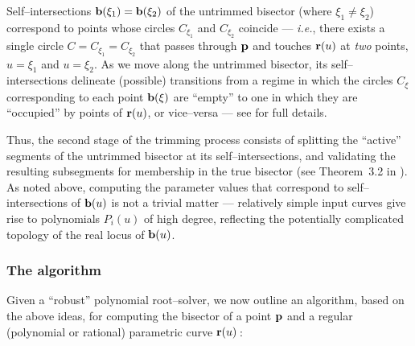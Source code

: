 Self--intersections ${\bf b}(\xi_1)={\bf b}(\xi_2)$ of the
untrimmed bisector (where $\xi_1\not=\xi_2$) correspond to points
whose circles $C_{\xi_1}$ and $C_{\xi_2}$ coincide --- {\it i.e.},
there exists a single circle $C=C_{\xi_1}=C_{\xi_2}$ that passes
through ${\bf p}$ and touches ${\bf r}(u)$ at {\it two\/} points,
$u=\xi_1$ and $u=\xi_2$. As we move along the untrimmed bisector,
its self--intersections delineate (possible) transitions from a
regime in which the circles $C_\xi$ corresponding to each point
${\bf b}(\xi)$ are ``empty'' to one in which they are ``occupied''
by points of ${\bf r}(u)$, or vice--versa --- see \cite{farouki91b}
for full details.

Thus, the second stage of the trimming process consists of
splitting the ``active'' segments of the untrimmed bisector at
its self--intersections, and validating the resulting subsegments
for membership in the true bisector (see Theorem~3.2 in \cite
{farouki91b}). As noted above, computing the parameter values
that correspond to self--intersections of ${\bf b}(u)$ is not
a trivial matter --- relatively simple input curves give rise to
polynomials $P_i(u)$ of high degree, reflecting the potentially
complicated topology of the real locus of ${\bf b}(u)$.

\subsubsection{The algorithm}

Given a ``robust'' polynomial root--solver, we now outline an
algorithm, based on the above ideas, for computing the bisector
of a point ${\bf p}$ and a regular (polynomial or rational)
parametric curve ${\bf r}(u)\,$:


